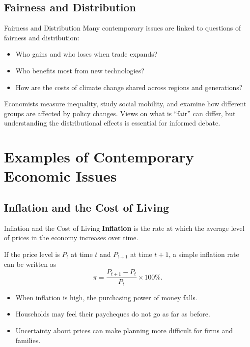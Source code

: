 \documentclass[aspectratio=169]{beamer}
\begin{document}
\subsection{Fairness and Distribution}

\begin{frame}{Fairness and Distribution}
  \transfade
  Many contemporary issues are linked to questions of fairness and distribution:

  \begin{itemize}
    \item Who gains and who loses when trade expands?
    \item Who benefits most from new technologies?
    \item How are the costs of climate change shared across regions and generations?
  \end{itemize}

  \vspace{0.3cm}
  Economists measure inequality, study social mobility, and examine how different groups
  are affected by policy changes. Views on what is ``fair'' can differ, but understanding the
  distributional effects is essential for informed debate.
\end{frame}

\section{Examples of Contemporary Economic Issues}

\subsection{Inflation and the Cost of Living}

\begin{frame}{Inflation and the Cost of Living}
  \transfade
  \textbf{Inflation} is the rate at which the average level of prices in the economy increases over time.

  \vspace{0.2cm}
  If the price level is $P_t$ at time $t$ and $P_{t+1}$ at time $t+1$, a simple inflation rate can be written as
  \[
    \pi = \frac{P_{t+1} - P_t}{P_t} \times 100\%.
  \]

  \vspace{0.2cm}
  \begin{itemize}
    \item When inflation is high, the purchasing power of money falls.
    \item Households may feel their paycheques do not go as far as before.
    \item Uncertainty about prices can make planning more difficult for firms and families.
  \end{itemize}
\end{frame}
\end{document}
